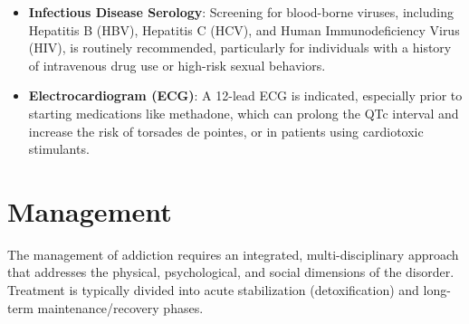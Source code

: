 \begin{itemize}
    \item \textbf{Infectious Disease Serology}: Screening for blood-borne viruses, including Hepatitis B (HBV), Hepatitis C (HCV), and Human Immunodeficiency Virus (HIV), is routinely recommended, particularly for individuals with a history of intravenous drug use or high-risk sexual behaviors.
    \item \textbf{Electrocardiogram (ECG)}: A 12-lead ECG is indicated, especially prior to starting medications like methadone, which can prolong the QTc interval and increase the risk of torsades de pointes, or in patients using cardiotoxic stimulants.
\end{itemize}

\section*{Management}
The management of addiction requires an integrated, multi-disciplinary approach that addresses the physical, psychological, and social dimensions of the disorder. Treatment is typically divided into acute stabilization (detoxification) and long-term maintenance/recovery phases.
